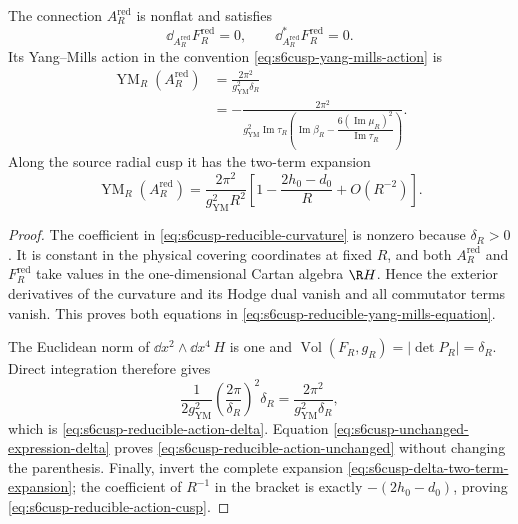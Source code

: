\begin{theorem}
\label{thm:s6cusp-reducible-yang-mills-critical}
The connection \(A_R^{\mathrm{red}}\) is nonflat and satisfies
\begin{equation}\label{eq:s6cusp-reducible-yang-mills-equation}
 \dd_{A_R^{\mathrm{red}}}F_R^{\mathrm{red}}=0,
 \qquad
 \dd_{A_R^{\mathrm{red}}}^*F_R^{\mathrm{red}}=0.
\end{equation}
Its Yang--Mills action in the convention
\eqref{eq:s6cusp-yang-mills-action} is
\begin{align}
 \operatorname{YM}_R(A_R^{\mathrm{red}})
 &=\frac{2\pi^2}{g_{\mathrm{YM}}^2\delta_R}
 \label{eq:s6cusp-reducible-action-delta}\\
 &=-\frac{2\pi^2}{g_{\mathrm{YM}}^2
 \operatorname{Im}\tau_R
 \left(
  \operatorname{Im}\beta_R-
  \dfrac{6(\operatorname{Im}\mu_R)^2}
  {\operatorname{Im}\tau_R}
 \right)}.
 \label{eq:s6cusp-reducible-action-unchanged}
\end{align}
Along the source radial cusp it has the two-term expansion
\begin{equation}\label{eq:s6cusp-reducible-action-cusp}
 \operatorname{YM}_R(A_R^{\mathrm{red}})
 =\frac{2\pi^2}{g_{\mathrm{YM}}^2R^2}
 \left[
  1-\frac{2h_0-d_0}{R}+O(R^{-2})
 \right].
\end{equation}
\end{theorem}

\begin{proof}
The coefficient in \eqref{eq:s6cusp-reducible-curvature} is nonzero because
\(\delta_R>0\).  It is constant in the physical covering coordinates at
fixed \(R\), and both \(A_R^{\mathrm{red}}\) and
\(F_R^{\mathrm{red}}\) take values in the one-dimensional Cartan algebra
\(\R H\).  Hence the exterior derivatives of the curvature and its Hodge
dual vanish and all commutator terms vanish.  This proves both equations in
\eqref{eq:s6cusp-reducible-yang-mills-equation}.

The Euclidean norm of \(\dd x^2\wedge\dd x^4\,H\) is one and
\(\operatorname{Vol}(F_R,g_R)=|\det P_R|=\delta_R\).  Direct integration
therefore gives
\[
 \frac1{2g_{\mathrm{YM}}^2}
 \left(\frac{2\pi}{\delta_R}\right)^2\delta_R
 =\frac{2\pi^2}{g_{\mathrm{YM}}^2\delta_R},
\]
which is \eqref{eq:s6cusp-reducible-action-delta}.  Equation
\eqref{eq:s6cusp-unchanged-expression-delta} proves
\eqref{eq:s6cusp-reducible-action-unchanged} without changing the
parenthesis.  Finally, invert the complete expansion
\eqref{eq:s6cusp-delta-two-term-expansion}; the coefficient of \(R^{-1}\)
in the bracket is exactly \(-(2h_0-d_0)\), proving
\eqref{eq:s6cusp-reducible-action-cusp}.
\end{proof}


